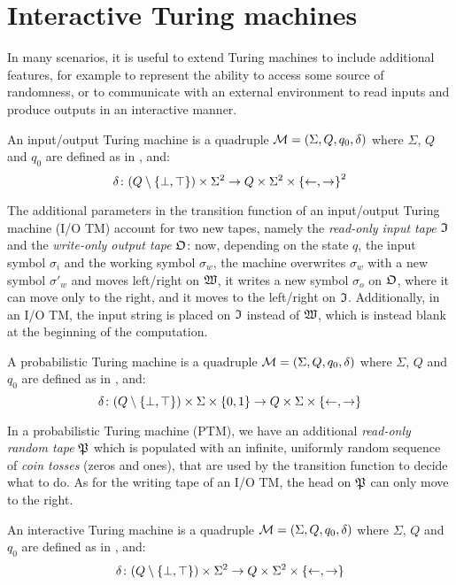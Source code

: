\section{Interactive Turing machines}
In many scenarios, it is useful to extend Turing machines to include additional features, for 
example to represent the ability to access some source of randomness, or to communicate with an 
external environment to read inputs and produce outputs in an interactive manner.
\begin{definition}
  An input/output Turing machine is a quadruple \(\mathcal{M} = \Tuple{\Sigma, Q, q_0, \delta}\)
  where \(\Sigma \), \(Q\) and \(q_0\) are defined as in , and:
  \[
    \delta\colon {\Parens*{Q \setminus \Set{\bot, \top}} \times \Sigma^2} \to 
    {Q \times \Sigma^2 \times \Set{\leftarrow, \rightarrow}^2}
  \]  
\end{definition}

The additional parameters in the transition function of an input/output Turing machine (I/O TM) 
account for two new tapes, namely the \emph{read-only input tape} \(\Tapein \) and the 
\emph{write-only output tape} \(\Tapeout \): now, depending on the state \(q\), the input symbol 
\(\sigma_{i}\) and the working symbol \(\sigma_{w}\), the machine overwrites \(\sigma_{w}\) with a 
new symbol \(\sigma'_{w}\) and moves left/right on \(\Tapework \), it writes a new symbol 
\(\sigma_{o}\) on \(\Tapeout \), where it can move only to the right, and it moves to the 
left/right on \(\Tapein \).
Additionally, in an I/O TM, the input string is placed on \(\Tapein \) instead of \(\Tapework \), 
which is instead blank at the beginning of the computation.
\begin{definition}
  A probabilistic Turing machine is a quadruple \(\mathcal{M} = \Tuple{\Sigma, Q, q_0, \delta}\)
  where \(\Sigma \), \(Q\) and \(q_0\) are defined as in , and:
  \[
    \delta\colon {\Parens*{Q \setminus \Set{\bot, \top}} \times \Sigma \times \Set{0, 1}} \to 
    {Q \times \Sigma \times \Set{\leftarrow, \rightarrow}}
  \]    
\end{definition}

In a probabilistic Turing machine (PTM), we have an additional \emph{read-only random tape} 
\(\Taperand \) which is populated with an infinite, uniformly random sequence of \emph{coin tosses} 
(zeros and ones), that are used by the transition function to decide what to do.
As for the writing tape of an I/O TM, the head on \(\Taperand \) can only move to the right.
\begin{definition}
  An interactive Turing machine is a quadruple \(\mathcal{M} = \Tuple{\Sigma, Q, q_0, \delta}\)
  where \(\Sigma \), \(Q\) and \(q_0\) are defined as in , and:
  \[
    \delta\colon {\Parens*{Q \setminus \Set{\bot, \top}} \times \Sigma^2} \to
    {Q \times \Sigma^2 \times \Set{\leftarrow, \rightarrow}}
  \]
\end{definition}

